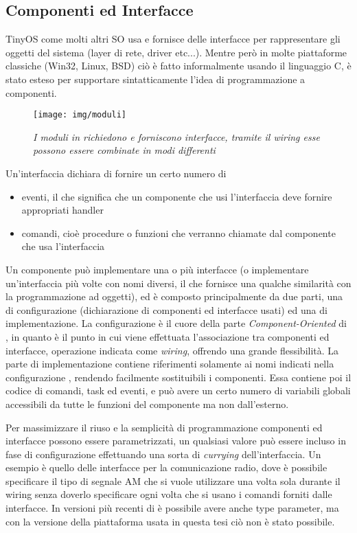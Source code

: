 \documentclass[twoside,11pt,a4paper,italian,openany]{book}
\begin{document}
 

\subsection{Componenti ed Interfacce}
TinyOS come molti altri SO usa e fornisce delle interfacce per rappresentare gli oggetti del 
sistema (layer di rete, driver etc...). 
Mentre però in molte piattaforme classiche (Win32, Linux, BSD) ciò è fatto informalmente 
usando il linguaggio C, \nesc è stato esteso per supportare sintatticamente l'idea di 
programmazione a componenti. 
\begin{figure}
\texttt{[image: img/moduli]}
\caption{\emph{I moduli in \nesc richiedono e forniscono interfacce, tramite il wiring esse possono essere combinate in modi differenti}}
\end{figure}
Un'interfaccia dichiara di fornire un certo numero di 
\begin{itemize}

\item{eventi, il che significa che un componente che usi l'interfaccia deve fornire appropriati
handler} 

\item{comandi, cioè procedure o funzioni che verranno chiamate dal componente che usa l'interfaccia}
\end{itemize}

Un componente può implementare una o più interfacce (o implementare un'interfaccia più volte 
con nomi diversi, il che fornisce una qualche similarità con la programmazione ad oggetti), 
ed è composto principalmente da due parti, una di configurazione 
(dichiarazione di componenti ed interfacce usati) ed una di implementazione.
La configurazione è il cuore della parte \emph{Component-Oriented} di \nesc, in quanto è 
il punto in cui viene effettuata l'associazione tra componenti ed interfacce, operazione indicata
 come \emph{wiring}, offrendo una grande flessibilità. 
La parte di implementazione contiene riferimenti solamente ai nomi indicati nella configurazione
, rendendo facilmente sostituibili i componenti.
Essa contiene poi il codice di comandi, task ed eventi, e può avere un 
certo numero di variabili globali accessibili da tutte le funzioni del componente ma non 
dall'esterno. 

Per massimizzare il riuso e la semplicità di programmazione componenti ed interfacce possono 
essere parametrizzati, un qualsiasi valore può essere 
incluso in fase di configurazione effettuando una sorta di \emph{currying} dell'interfaccia. 
Un esempio è quello delle interfacce per la comunicazione radio, dove è possibile specificare 
il tipo di segnale AM che si vuole utilizzare una volta sola durante il wiring senza doverlo specificare ogni volta che si usano i comandi forniti dalle interfacce. 
In versioni più recenti di \nesc è possibile avere anche type parameter, ma con la versione della piattaforma usata in questa tesi ciò non è stato possibile. 
\end{document}

